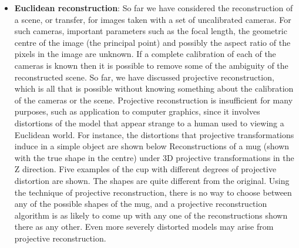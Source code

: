 \documentclass{report}
\begin{document}
\begin{itemize}
\begin{enumerate}
                \item Triangulate the 3D point X from $\mathbf{x}$ and $\mathbf{x}'$ using P and $\mathtt{P}'$. 
                \item Project the 3D point into the third view as $\mathbf{x}''=\mathtt{P}''X$
            \end{enumerate}
            This procedure only requires projective information. An alternative procedure is to use the multi-view tensors (the fundamental matrix and trifocal tensor) to transfer the point directly without an explicit 3D reconstruction. Both methods have their advantages.
            \bigbreak \noindent 
            Suppose the camera rotates about its centre or that all the scene points of interest lie on a plane. Then the appropriate multiple view relations are the planar projective transformations between the images. In this case, a point seen in just one image can be transferred to any other image
        \item \textbf{Euclidean reconstruction}: So far we have considered the reconstruction of a scene, or transfer, for images taken with a set of uncalibrated cameras. For such cameras, important parameters such as the focal length, the geometric centre of the image (the principal point) and possibly the aspect ratio of the pixels in the image are unknown. If a complete calibration of each of the cameras is known then it is possible to remove some of the ambiguity of the reconstructed scene.
            \bigbreak \noindent 
            So far, we have discussed projective reconstruction, which is all that is possible without knowing something about the calibration of the cameras or the scene. Projective reconstruction is insufficient for many purposes, such as application to computer graphics, since it involves distortions of the model that appear strange to a human used to viewing a Euclidean world. For instance, the distortions that projective transformations induce in a simple object are shown below
            \bigbreak \noindent 
            \bigbreak \noindent 
            Reconstructions of a mug (shown with the true shape in the centre) under 3D projective transformations in the Z direction. Five examples of the cup with different degrees of projective distortion are shown. The shapes are quite different from the original.
            \bigbreak \noindent 
            Using the technique of projective reconstruction, there is no way to choose between any of the possible shapes of the mug, and a projective reconstruction algorithm is as likely to come up with any one of the reconstructions shown there as any other. Even more severely distorted models may arise from projective reconstruction.

\end{itemize}
\end{document}
